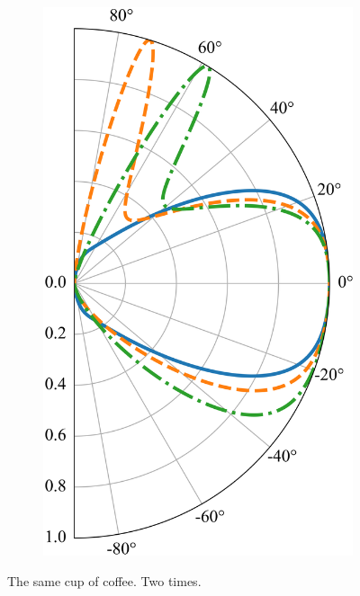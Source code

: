 \begin{figure}[H]
\begin{subfigure}[b]{0.3\linewidth}
            \includegraphics[width = \linewidth]{fig/tunneling shift/U0.285.png}
            \caption{}
            \label{fig:asym4}
        \end{subfigure}
        \caption{The same cup of coffee. Two times.}
        \label{fig:asym}
    \end{figure}

